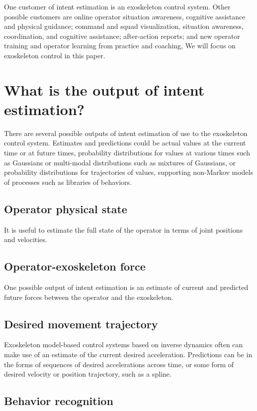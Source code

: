 \documentclass[letterpaper,12pt,fullpage]{article}
\begin{document}
One customer of intent estimation is an exoskeleton control system.
Other possible customers are online operator situation awareness,
cognitive assistance
and physical guidance;
command and squad visualization, situation awareness,
coordination, and cognitive assistance;
after-action reports; and new operator training and
operator learning from practice and coaching,
We will focus on exoskeleton control in this paper.

\section{What is the output of intent estimation?}

There are several possible outputs of intent estimation of use to the
exoskeleton control system.
Estimates and predictions could be actual values at the current time or at
future times, probability distributions for
values at various times such as Gaussians or multi-modal distributions 
such as mixtures of Gaussians, or probability distributions for trajectories
of values, supporting non-Markov models of processes such as libraries
of behaviors.

\subsection{Operator physical state}

It is useful to estimate the full state of the operator in terms
of joint positions and velocities.

\subsection{Operator-exoskeleton force}

One possible output of intent estimation is an estimate of current
and predicted future forces between the operator and the exoskeleton.

\subsection{Desired movement trajectory}

Exoskeleton model-based control systems based on inverse dynamics often
can make use of an estimate of the current desired acceleration.
Predictions can be in the forms of sequences of desired accelerations
across time, or some form of desired velocity or position trajectory,
such as a spline.

\subsection{Behavior recognition}
\end{document}
